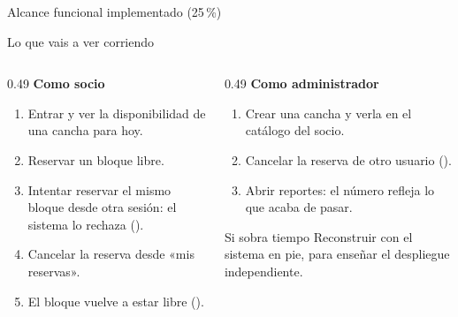 %
%
%

%
       {Alcance funcional implementado (25\,\%)}

\begin{frame}{Lo que vais a ver corriendo}

  \begin{columns}[T]
    \begin{column}{0.49\textwidth}
      \textbf{Como socio}
      \begin{enumerate}\scriptsize
        \item Entrar y ver la disponibilidad de una cancha para hoy.
        \item Reservar un bloque libre.
        \item Intentar reservar \alert{el mismo bloque} desde otra sesión:
              el sistema lo rechaza ().
        \item Cancelar la reserva desde «mis reservas».
        \item El bloque vuelve a estar libre ().
      \end{enumerate}
    \end{column}
    \begin{column}{0.49\textwidth}
      \textbf{Como administrador}
      \begin{enumerate}[start=6]\scriptsize
        \item Crear una cancha y verla en el catálogo del socio.
        \item Cancelar la reserva de otro usuario ().
        \item Abrir reportes: el número refleja lo que acaba de pasar.
      \end{enumerate}
      \vspace{4pt}
      \begin{block}{Si sobra tiempo}
        \scriptsize
        Reconstruir  con el sistema en pie, para enseñar el
        despliegue independiente.
      \end{block}
    \end{column}
  \end{columns}
\end{frame}
